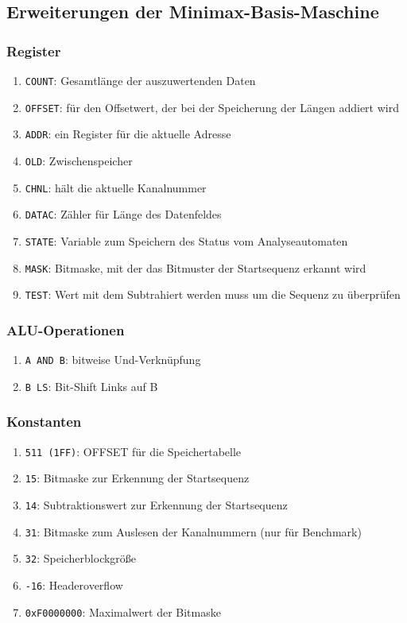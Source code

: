 \documentclass[12pt,titlepage]{article}
\begin{document}
\subsection{Erweiterungen der Minimax-Basis-Maschine}

\subsubsection{Register}

\begin{enumerate}
\item \texttt{COUNT}: Gesamtl{\"a}nge der auszuwertenden Daten
\item \texttt{OFFSET}: f{\"u}r den Offsetwert, der bei der Speicherung der Längen addiert wird
\item \texttt{ADDR}: ein Register f{\"u}r die aktuelle Adresse
\item \texttt{OLD}: Zwischenspeicher
\item \texttt{CHNL}: hält die aktuelle Kanalnummer
\item \texttt{DATAC}: Zähler für Länge des Datenfeldes
\item \texttt{STATE}: Variable zum Speichern des Status vom Analyseautomaten
\item \texttt{MASK}: Bitmaske, mit der das Bitmuster der Startsequenz erkannt wird
\item \texttt{TEST}: Wert mit dem Subtrahiert werden muss um die Sequenz zu überprüfen
\end{enumerate}

\subsubsection{ALU-Operationen}

\begin{enumerate}
\item \texttt{A AND B}: bitweise Und-Verknüpfung
\item \texttt{B LS}: Bit-Shift Links auf B
\end{enumerate}

\subsubsection{Konstanten}
\begin{enumerate}
\item \texttt{511 (1FF)}: OFFSET für die Speichertabelle
\item \texttt{15}: Bitmaske zur Erkennung der Startsequenz
\item \texttt{14}: Subtraktionswert zur Erkennung der Startsequenz
\item \texttt{31}: Bitmaske zum Auslesen der Kanalnummern (nur für Benchmark)
\item \texttt{32}: Speicherblockgröße
\item \texttt{-16}: Headeroverflow
\item \texttt{0xF0000000}: Maximalwert der Bitmaske
\end{enumerate}
\end{document}
